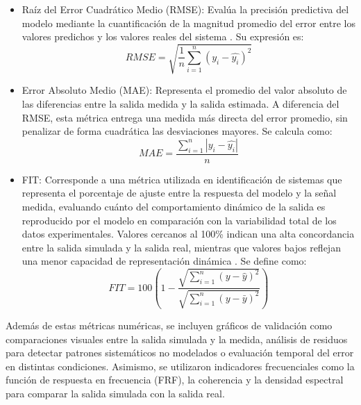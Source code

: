 \documentclass[11pt]{report}
\begin{document}
\begin{enumerate}
\begin{itemize}
    \item Raíz del Error Cuadrático Medio (RMSE): Evalúa la precisión predictiva del modelo mediante la cuantificación de la magnitud promedio del error entre los valores predichos y los valores reales del sistema \cite{10.3389/fenrg.2022.822555}. Su expresión es:
 \begin{equation} \label{rmse} 
        RMSE=\sqrt{\frac{1}{n}\sum_{i=1}^{n}{(y_i-\hat{y_i})^2}}
       \end{equation} 
    
    \item Error Absoluto Medio (MAE): Representa el promedio del valor absoluto de las diferencias entre la salida medida y la salida estimada. A diferencia del RMSE, esta métrica entrega una medida más directa del error promedio, sin penalizar de forma cuadrática las desviaciones mayores. Se calcula como\cite{ALQATAMIN2025128344}:
\begin{equation} \label{mae} 
        MAE=\frac{\sum_{i=1}^{n}{|y_i-\hat{y_i}|}}{n}
\end{equation}
    \item FIT: Corresponde a una métrica utilizada en identificación de sistemas que representa el porcentaje de ajuste entre la respuesta del modelo y la señal medida, evaluando cuánto del comportamiento dinámico de la salida es reproducido por el modelo en comparación con la variabilidad total de los datos experimentales. Valores cercanos al 100\% indican una alta concordancia entre la salida simulada y la salida real, mientras que valores bajos reflejan una menor capacidad de representación dinámica \cite{ljung1999system} \cite{MUSTAFARAJ2010348}. Se define como:
\begin{equation} \label{fit} 
         FIT=100 (1- \frac{\sqrt{\sum_{i=1}^{n}{(y -\hat{y})^2}}}{\sqrt{\sum_{i=1}^{n}{(y- \bar{y})^2}}})
\end{equation}


   
\end{itemize}
Además de estas métricas numéricas, se incluyen gráficos de validación como comparaciones visuales entre la salida simulada y la medida, análisis de residuos para detectar patrones sistemáticos no modelados o evaluación temporal del error en distintas condiciones. Asimismo, se utilizaron indicadores frecuenciales como la función de respuesta en frecuencia (FRF), la coherencia y la densidad espectral para comparar la salida simulada con la salida real.


\end{enumerate}
\end{document}
